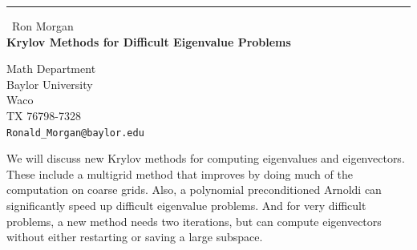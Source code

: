 \documentclass{report}
\begin{document}
\begin{center}
\rule{6in}{1pt} \
{\large Ron Morgan \\
{\bf Krylov Methods for Difficult Eigenvalue Problems}}

Math Department \\ Baylor University \\ Waco \\ TX 76798-7328
\\
{\tt Ronald\_Morgan@baylor.edu}\end{center}

We will discuss new Krylov methods for computing eigenvalues and
eigenvectors. These include a multigrid method that improves by doing
much of the computation on coarse grids. Also, a polynomial
preconditioned Arnoldi can significantly speed up difficult eigenvalue
problems. And for very difficult problems, a new method needs two
iterations, but can compute eigenvectors without either restarting or
saving a large subspace.
\end{document}
